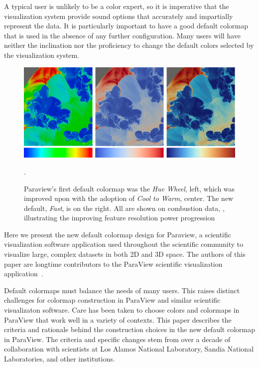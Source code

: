 \documentclass{IEEEcsmag}
\newcommand*{\colormap}[1]{\textsl{#1}\xspace}
\newcommand*{\huewheel}{\colormap{Hue Wheel}}
\newcommand*{\coolwarm}{\colormap{Cool to Warm}}
\newcommand*{\fast}{\colormap{Fast}}
\begin{document}
A typical user is unlikely to be a color expert, so it is imperative that the visualization system provide sound options that accurately and impartially represent the data. It is particularly important to have a good default colormap that is used in the absence of any further configuration. Many users will have neither the inclination nor the proficiency to change the default colors selected by the visualization system.


\begin{figure}[htb]
\centering
\includegraphics[width=\textwidth]{Final_Pics/Larsen_the3.png}
\caption{Paraview's first default colormap was the \huewheel, left, which was improved upon with the adoption of \coolwarm, center. The new default, \fast, is on the right. All are shown on combustion data, \cite{Larsen}, illustrating the improving feature resolution power progression}.
\label{Larsen3}
\end{figure}

Here we present the new default colormap design for Paraview, a scientific visualization software application used throughout the scientific community to visualize large, complex datasets in both 2D and 3D space. The authors of this paper are longtime contributors to the ParaView scientific visualization application~\cite{Ahrens2005}.

Default colormaps must balance the needs of many users. This raises distinct challenges for colormap construction in ParaView and similar scientific visualizaton software.
Care has been taken to choose colors and colormaps in ParaView that work well in a variety of contexts.
This paper describes the criteria and rationale behind the construction choices in the new default colormap in ParaView.
The criteria and specific changes stem from over a decade of collaboration with scientists at Los Alamos National Laboratory, Sandia National Laboratories, and other institutions.
\end{document}
